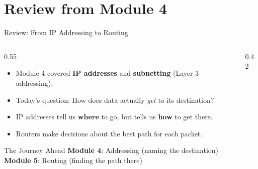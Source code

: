 \documentclass[aspectratio=169]{beamer}  %
\begin{document}


\section*{Review from Module 4}

\begin{frame}{Review: From IP Addressing to Routing}
    \begin{columns}[T]
        \begin{column}{0.55\textwidth}
            \begin{itemize}
                \item Module 4 covered \textbf{IP addresses} and \textbf{subnetting} (Layer 3 addressing).
                \item Today's question: How does data actually \textit{get} to its destination?
                \item IP addresses tell us \textbf{where} to go, but  tells us \textbf{how} to get there.
                \item Routers make decisions about the best path for each packet.
            \end{itemize}
            
            \vspace{0.3em}
            \begin{alertblock}{The Journey Ahead}
                \textbf{Module 4}: Addressing (naming the destination) \\
                \textbf{Module 5}: Routing (finding the path there)
            \end{alertblock}
        \end{column}
        \begin{column}{0.42\textwidth}
            \begin{center}
\end{center}
\end{column}
\end{columns}
\end{frame}
\end{document}
